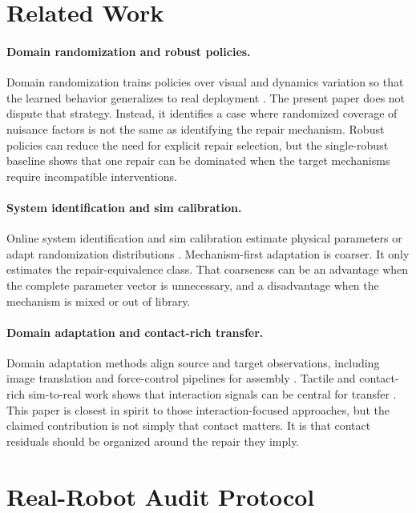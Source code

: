 \documentclass{article}
\begin{document}
\section{Related Work}

\paragraph{Domain randomization and robust policies.}
Domain randomization trains policies over visual and dynamics variation so that
the learned behavior generalizes to real deployment \citep{tobin2017domain,
peng2018dynamics,muratore2022robot}. The present paper does not dispute that
strategy. Instead, it identifies a case where randomized coverage of nuisance
factors is not the same as identifying the repair mechanism. Robust policies can
reduce the need for explicit repair selection, but the single-robust baseline
shows that one repair can be dominated when the target mechanisms require
incompatible interventions.

\paragraph{System identification and sim calibration.}
Online system identification and sim calibration estimate physical parameters or
adapt randomization distributions \citep{tan2018agile,yu2017uposi,
chebotar2019closing}. Mechanism-first adaptation is coarser. It only estimates
the repair-equivalence class. That coarseness can be an advantage when the
complete parameter vector is unnecessary, and a disadvantage when the mechanism
is mixed or out of library.

\paragraph{Domain adaptation and contact-rich transfer.}
Domain adaptation methods align source and target observations, including image
translation and force-control pipelines for assembly \citep{shi2023cyclegan,
yuan2022assembly}. Tactile and contact-rich sim-to-real work shows that
interaction signals can be central for transfer \citep{ding2021tactile,
lin2023bitouch}. This paper is closest in spirit to those interaction-focused
approaches, but the claimed contribution is not simply that contact matters. It
is that contact residuals should be organized around the repair they imply.

\section{Real-Robot Audit Protocol}
\end{document}
